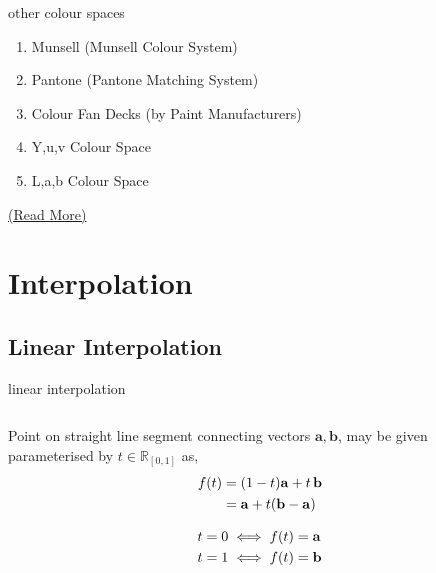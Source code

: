 \documentclass[aspectratio=169,xcolor={dvipsnames,svgnames}]{beamer}
\begin{document}
\begin{frame}[label={sec:orgeb1b8fc}]{other colour spaces}
\begin{enumerate}
\item Munsell (Munsell Colour System)
\item Pantone (Pantone Matching System)
\item Colour Fan Decks (by Paint Manufacturers)
\item Y,u,v Colour Space
\item L,a,b Colour Space
\end{enumerate}


\href{https://en.wikipedia.org/wiki/List\_of\_color\_spaces\_and\_their\_uses}{(Read More)}
\end{frame}

\section{Interpolation}
\label{sec:org9d32781}

\subsection{Linear Interpolation}
\label{sec:org654cbd6}

\begin{frame}[label={sec:org1cb4518}]{linear interpolation}
\begin{columns}
\begin{column}{.5\columnwidth}
Point on straight line segment connecting vectors
\(\mathbf{a},\mathbf{b}\), may be given parameterised by
\(t\in\mathbb{R}_{[0,1]}\) as,
\begin{align}
  \notag
  f(t) &= (1-t)\mathbf{a} + t\,\mathbf{b} \\
  \notag
  &= \mathbf{a} + t(\mathbf{b}-\mathbf{a})
\end{align}

\begin{align}
  \notag
  t=0 &\iff f(t) = \mathbf{a} \\
  \notag
  t=1 &\iff f(t) = \mathbf{b}
\end{align}
\end{column}
\end{columns}
\end{frame}
\end{document}
